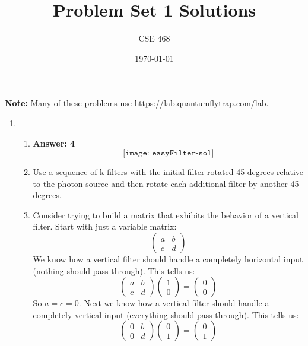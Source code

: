\documentclass[12pt]{article}
\title{Problem Set 1 Solutions}
\author{CSE 468}
\date{\today}
\begin{document}
\maketitle

\noindent \textbf{Note:} Many of these problems use  https://lab.quantumflytrap.com/lab.

\begin{enumerate}[font=\bfseries]
    \item 
        \begin{enumerate}
        \item \textbf{Answer: 4}
            \[\texttt{[image: easyFilter-sol]}\]
        \item Use a sequence of k filters with the initial filter rotated 45 degrees relative to the photon source and then rotate each additional filter by another 45 degrees.
        \item Consider trying to build a matrix that exhibits the behavior of a vertical filter. Start with just a variable matrix: 
        \[\begin{pmatrix}
            a & b \\ c & d
        \end{pmatrix}\]
        We know how a vertical filter should handle a completely horizontal input (nothing should pass through). This tells us:
        \[\begin{pmatrix}
            a & b \\ c & d
        \end{pmatrix}
        \begin{pmatrix}
        1 \\ 0
        \end{pmatrix}
        =
        \begin{pmatrix}
        0 \\ 0
        \end{pmatrix}
        \]
        So $a = c = 0$. Next we know how a vertical filter should handle a completely vertical input (everything should pass through). This tells us:
        \[
        \begin{pmatrix}
            0 & b \\ 0 & d
        \end{pmatrix}
        \begin{pmatrix}
        0\\ 1
        \end{pmatrix}
        =
        \begin{pmatrix}
        0\\ 1

\end{pmatrix}\]
\end{enumerate}
\end{enumerate}
\end{document}

